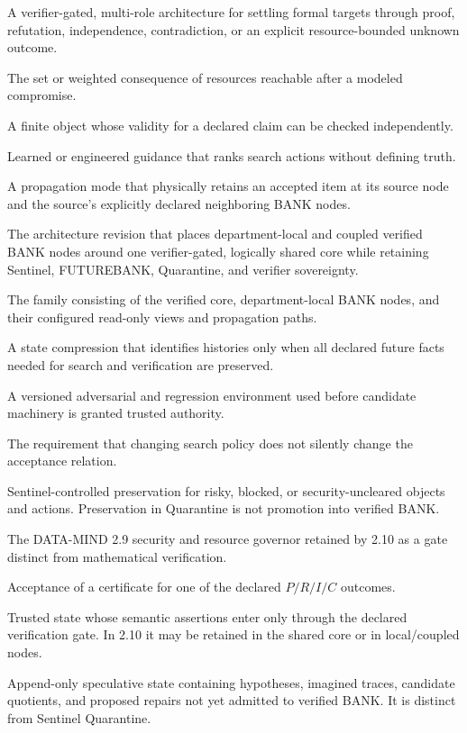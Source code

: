 \documentclass[11pt,oneside]{book}
\theoremstyle{definition}
\theoremstyle{remark}
\begin{document}
\begin{description}[style=nextline,leftmargin=1.8em,labelindent=0pt]
\item[AMLD] A verifier-gated, multi-role architecture for settling formal targets through proof,
refutation, independence, contradiction, or an explicit resource-bounded unknown outcome.
\item[Blast radius] The set or weighted consequence of resources reachable after a modeled compromise.
\item[Certificate] A finite object whose validity for a declared claim can be checked independently.
\item[COMPASS] Learned or engineered guidance that ranks search actions without defining truth.
\item[Coupled BANK] A propagation mode that physically retains an accepted item at its source node
and the source's explicitly declared neighboring BANK nodes.
\item[DATA-MIND 2.10] The architecture revision that places department-local and coupled verified
BANK nodes around one verifier-gated, logically shared core while retaining Sentinel, FUTUREBANK,
Quarantine, and verifier sovereignty.
\item[Federated BANK] The family consisting of the verified core, department-local BANK nodes, and
their configured read-only views and propagation paths.
\item[Future-sufficient quotient] A state compression that identifies histories only when all declared
future facts needed for search and verification are preserved.
\item[Ocean] A versioned adversarial and regression environment used before candidate machinery is
granted trusted authority.
\item[Policy-neutral verification] The requirement that changing search policy does not silently change
the acceptance relation.
\item[Quarantine BANK] Sentinel-controlled preservation for risky, blocked, or security-uncleared
objects and actions. Preservation in Quarantine is not promotion into verified BANK.
\item[Sentinel] The DATA-MIND 2.9 security and resource governor retained by 2.10 as a gate distinct
from mathematical verification.
\item[Settlement] Acceptance of a certificate for one of the declared $P/R/I/C$ outcomes.
\item[Verified BANK] Trusted state whose semantic assertions enter only through the declared
verification gate. In 2.10 it may be retained in the shared core or in local/coupled nodes.
\item[FUTUREBANK] Append-only speculative state containing hypotheses, imagined traces, candidate
quotients, and proposed repairs not yet admitted to verified BANK. It is distinct from Sentinel
Quarantine.
\end{description}
\end{document}
